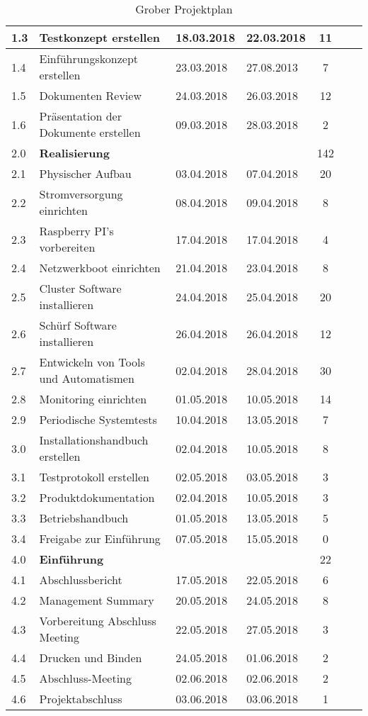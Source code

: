 \begin{table}[H]
\begin{tabular}{p{0.7cm}p{6.8cm}p{2cm}p{2cm}|c|c|c|}
1.3 & Testkonzept erstellen & 18.03.2018 & 22.03.2018 & 11 & &\\\hline
1.4 & Einführungskonzept erstellen & 23.03.2018 & 27.08.2013 & 7 & &\\\hline
1.5 & Dokumenten Review & 24.03.2018 & 26.03.2018  & 12 & & \\\hline
1.6 & Präsentation der Dokumente erstellen & 09.03.2018& 28.03.2018 & 2 & & \\\hline
\rowcolor{subheading} 2.0 & \textbf{Realisierung} & & & 142 & & \\\hline
2.1 & Physischer Aufbau & 03.04.2018 & 07.04.2018 & 20  & & \\\hline
2.2 & Stromversorgung einrichten & 08.04.2018 & 09.04.2018  & 8 & & \\\hline
2.3 & Raspberry PI's vorbereiten & 17.04.2018 & 17.04.2018 & 4 & & \\\hline
2.4 & Netzwerkboot einrichten & 21.04.2018 & 23.04.2018 & 8 & & \\\hline
2.5 & Cluster Software installieren & 24.04.2018 & 25.04.2018 & 20 & &  \\\hline
2.6 & Schürf Software installieren & 26.04.2018 & 26.04.2018 & 12  & & \\\hline
2.7 & Entwickeln von Tools und Automatismen & 02.04.2018 & 28.04.2018 & 30 & &  \\\hline
2.8 & Monitoring einrichten & 01.05.2018 & 10.05.2018 & 14  & & \\\hline
2.9 & Periodische Systemtests & 10.04.2018 & 13.05.2018 & 7  & & \\\hline
3.0 & Installationshandbuch erstellen & 02.04.2018 & 10.05.2018 & 8 & &   \\\hline
3.1 & Testprotokoll erstellen & 02.05.2018 & 03.05.2018 & 3  & & \\\hline
3.2 & Produktdokumentation & 02.04.2018 & 10.05.2018 & 3  & & \\\hline
3.3 & Betriebshandbuch & 01.05.2018 & 13.05.2018 & 5  & & \\\hline
3.4 & Freigabe zur Einführung & 07.05.2018 & 15.05.2018 & 0 & &  \\\hline
\rowcolor{subheading} 4.0 & \textbf{Einführung} & & & 22 & & \\\hline
4.1 & Abschlussbericht & 17.05.2018 & 22.05.2018 & 6  & & \\\hline
4.2 & Management Summary & 20.05.2018 & 24.05.2018 & 8  & & \\\hline
4.3 & Vorbereitung  Abschluss Meeting & 22.05.2018 & 27.05.2018 & 3 & &  \\\hline
4.4 & Drucken und Binden & 24.05.2018 & 01.06.2018 & 2 & &  \\\hline
4.5 & Abschluss-Meeting & 02.06.2018 & 02.06.2018 & 2 & &  \\\hline
4.6 & Projektabschluss & 03.06.2018 & 03.06.2018 & 1 & &  \\\hline
\end{tabular}
\caption{Grober Projektplan}
\end{table}

